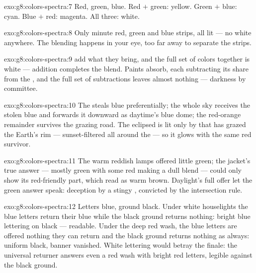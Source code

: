 \begin{solution}{exo:g8:colors-spectra:7}
Red, green, blue. Red $+$ green: yellow. Green $+$ blue: cyan.
Blue $+$ red: magenta. All three: white.
\end{solution}

\begin{solution}{exo:g8:colors-spectra:8}
Only minute red, green and blue strips, all lit --- no white
anywhere. The blending happens in your eye, too far away to
separate the strips.
\end{solution}

\begin{solution}{exo:g8:colors-spectra:9}
 add what they bring, and the full set of colors
together is white --- addition completes the blend. Paints
absorb, each subtracting its share from the , and the
full set of subtractions leaves almost nothing --- darkness by
committee.
\end{solution}

\begin{solution}{exo:g8:colors-spectra:10}
The  steals blue preferentially; the whole sky receives the
stolen blue and forwards it downward as daytime's blue dome;
the red-orange remainder survives the grazing  road. The
eclipsed  is lit only by  that has grazed the Earth's
rim --- sunset-filtered all around the  --- so it glows
with the same red survivor.
\end{solution}

\begin{solution}{exo:g8:colors-spectra:11}
The warm reddish lamps offered little green; the jacket's true
answer --- mostly green with some red making a dull blend ---
could only show its red-friendly part, which read as warm
brown. Daylight's full offer let the green answer speak:
deception by a stingy , convicted by the intersection
rule.
\end{solution}

\begin{solution}{exo:g8:colors-spectra:12}
Letters blue, ground black. Under white houselights the blue
letters return their blue while the black ground returns
nothing: bright blue lettering on black --- readable. Under the
deep red wash, the blue letters are offered nothing they can
return and the black ground returns nothing as always: uniform
black, banner vanished. White lettering would betray the
finale: the universal returner answers even a red wash with
bright red letters, legible against the black ground.
\end{solution}

